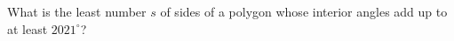 What is the least number $s$ of sides of a polygon whose interior angles add up to at least $2021^\circ$?
